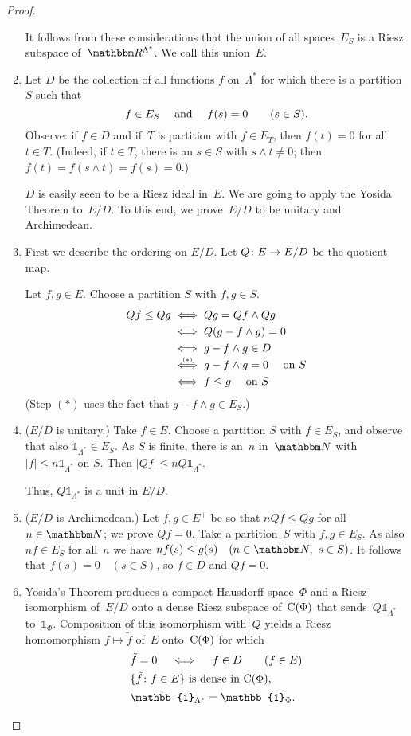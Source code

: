 \documentclass[main.tex]{subfiles}
\begin{document}
\begin{proof}
\begin{enumerate}[label=(\Roman*),itemindent=3em,labelwidth=3em]
It follows from these considerations 
that the union of all spaces~$E_S$
is a Riesz subspace of~$\R^{\Lambda^*}$.
We call this union~$E$.
%
\item \label{3.20-III}
Let $D$ be the collection of all functions $f$ on~$\Lambda^*$
for which there is a partition~$S$ such that
\begin{equation*}
f\in E_S \quad \text{ and } \quad f(s)=0 \qquad (s\in S)\text{.}
\end{equation*}
Observe: if $f\in D$ 
and if~$T$ is  
partition with $f\in E_T$,
then $f(t)=0$ for all $t\in T$.
(Indeed, if $t\in T$,
there is an $s\in S$ with $s\wedge t\neq 0$;
then $f(t)=f(s\wedge t)=f(s)=0$.)

$D$ is easily seen to be a Riesz ideal in~$E$.
We are going to apply the Yosida Theorem to~$E/D$.
To this end, 
we prove~$E/D$
to be unitary and Archimedean.
%
\item \label{3.20-IV}
First we describe the ordering on $E/D$.
Let $Q\colon E\rightarrow E/D$ be the quotient map.

Let $f,g\in E$. 
Choose a partition $S$ with $f,g\in S$.
\begin{align*}
Qf \leq Qg 
& \iff Qg = Qf \wedge Qg \\
& \iff Q(g-f\wedge g)=0 \\
& \iff g-f\wedge g \in D \\
& \mathrel{\smash{ \stackrel{\scriptscriptstyle (*)}{\iff}}} g-f\wedge g =0\quad\text{ on }S \\
& \iff f\leq g\quad\text{ on }S
\end{align*}
(Step $(*)$ uses the fact that $g-f\wedge g\in E_S$.)
%
\item \label{3.20-V}
($E/D$ is unitary.)
Take $f\in E$.
Choose a partition $S$ with $f\in E_S$,
and observe that also
$\mathbb{1}_{\Lambda^*}\in E_S$.
As $S$ is finite, 
there is an~$n$ in~$\N$
with $|f|\leq n \mathbb{1}_{\Lambda^*}$ on $S$.
Then $|Qf|\leq n Q\mathbb{1}_{\Lambda^*}$.

Thus, $Q\mathbb{1}_{\Lambda^*}$ is a unit in $E/D$.
%
\item \label{3.20-VI}
($E/D$ is Archimedean.)
Let $f,g\in E^+$ be so that $nQf\leq Qg$ for all $n\in \N$;
we prove $Qf=0$.
Take a partition~$S$ with $f,g\in E_S$.
As also $nf\in E_S$
for all~$n$
we have $nf(s)\leq g(s)\quad(n\in \N,\ s\in S)$.
It follows that $f(s)=0\quad (s\in S)$,
so $f\in D$ and $Qf=0$.
%
\item \label{3.20-VII}
Yosida's Theorem produces a compact Hausdorff space~$\Phi$
and a Riesz isomorphism of~$E/D$ 
onto a dense Riesz subspace of~$\mathrm{C}(\Phi)$
that sends~$Q\mathbb{1}_{\Lambda^*}$ to~$\mathbb{1}_\Phi$.
Composition of this isomorphism with~$Q$ 
yields a Riesz homomorphism $f\mapsto \tilde{f}$
of~$E$ onto~$\mathrm{C}(\Phi)$ for which
\begin{alignat*}{2}
& \tilde{f} = 0 \quad \iff \quad f\in D\qquad (f\in E) \\
& \{ \tilde{f}\colon f\in E\} \htam{ is dense in } \Cont{\Phi}\htam{, } \\
& \tilde{\mathbb{1}}_{\Lambda^*} = \mathbb{1}_\Phi\htam{.}
\end{alignat*}


\end{enumerate}
\end{proof}
\end{document}
